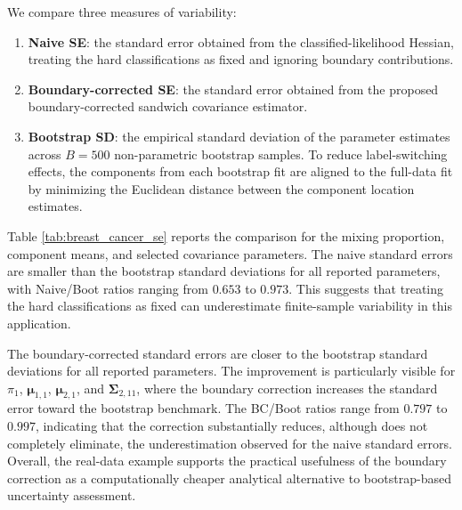 \documentclass[pdflatex,sn-mathphys-ay]{sn-jnl}%
\let\oldmu\mu
\renewcommand{\mu}{\boldsymbol{\oldmu}}
\let\oldSigma\Sigma
\renewcommand{\Sigma}{\boldsymbol{\oldSigma}}
\theoremstyle{thmstyleone}%
\theoremstyle{thmstyletwo}%
\theoremstyle{thmstylethree}%
\begin{document}
We compare three measures of variability:
\begin{enumerate}
    \item \textbf{Naive SE}: the standard error obtained from the classified-likelihood Hessian, treating the hard classifications as fixed and ignoring boundary contributions.
    \item \textbf{Boundary-corrected SE}: the standard error obtained from the proposed boundary-corrected sandwich covariance estimator.
    \item \textbf{Bootstrap SD}: the empirical standard deviation of the parameter estimates across $B=500$ non-parametric bootstrap samples. To reduce label-switching effects, the components from each bootstrap fit are aligned to the full-data fit by minimizing the Euclidean distance between the component location estimates.
\end{enumerate}

Table \ref{tab:breast_cancer_se} reports the comparison for the mixing proportion, component means, and selected covariance parameters. The naive standard errors are smaller than the bootstrap standard deviations for all reported parameters, with Naive/Boot ratios ranging from $0.653$ to $0.973$. This suggests that treating the hard classifications as fixed can underestimate finite-sample variability in this application.

The boundary-corrected standard errors are closer to the bootstrap standard deviations for all reported parameters. The improvement is particularly visible for $\pi_1$, $\mu_{1,1}$, $\mu_{2,1}$, and $\Sigma_{2,11}$, where the boundary correction increases the standard error toward the bootstrap benchmark. The BC/Boot ratios range from $0.797$ to $0.997$, indicating that the correction substantially reduces, although does not completely eliminate, the underestimation observed for the naive standard errors. Overall, the real-data example supports the practical usefulness of the boundary correction as a computationally cheaper analytical alternative to bootstrap-based uncertainty assessment.
\end{document}
